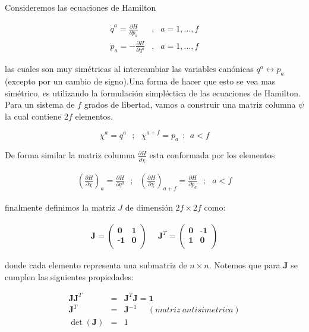 \documentclass[12pt]{report}
\begin{document}
Consideremos las ecuaciones de  Hamilton

\begin{eqnarray}
\dot{q}^a = \frac{\partial H}{\partial p_a}  &,&  a= 1,...,f \\
\dot{p}_a = -\frac{\partial H}{\partial q^a}  &,&  a=1,...,f 
\end{eqnarray} 

las cuales son muy simétricas al intercambiar las variables canónicas $q^a\leftrightarrow p_a$ (excepto por un cambio de signo).Una forma de hacer que esto se vea mas simétrico, es utilizando la formulación simpléctica de las ecuaciones de Hamilton. Para un sistema de $f$ grados de libertad, vamos a construir una matriz columna $\psi$ la cual contiene $2f$ elementos.

\begin{equation}
\chi^a = q^a \ \ \ ; \ \ \ \chi^{a+f}=p_a  \ \ ; \ \ a<f  
\end{equation}


De forma similar la matriz columna $\displaystyle\frac{\partial H}{\partial 
\chi}$ esta conformada por los elementos 

\begin{eqnarray}
\left( \frac{\partial H}{\partial \chi} \right)_a = \frac{\partial H}{\partial q^a} \ \ \ ; \ \ \  \left( \frac{\partial H}{\partial \chi} \right)_{a+f} =  \frac{\partial H}{\partial p_a}  \ \ \ ;  \ \ \ a<f
\end{eqnarray}


finalmente definimos la matriz $J$ de dimensión $2f \times 2f$ como:


\begin{eqnarray} 
\textbf{J}=
\left( 
\begin{array}{cc} 
\textbf{0} & \textbf{1}  \\
\textbf{-1} & \textbf{0}   \\
\end{array}
\right) \ \ \ \ \ \
\textbf{J}^T=\left( 
\begin{array}{cc} 
\textbf{0} & \textbf{-1}  \\
\textbf{1} & \textbf{0}   \\
\end{array}
\right)
\end{eqnarray}

donde cada elemento representa una submatriz de $n \times n$. Notemos que para $\textbf{J}$ se cumplen las siguientes propiedades:


\begin{eqnarray}
\textbf{J}\textbf{J}^T&=&\textbf{J}^T\textbf{J}=\textbf{1} \\
\textbf{J}^T&=&\textbf{J}^{-1} \ \ \  \ \ \ (matriz \ antisimetrica) \\
\det(\textbf{J})&=&1
\end{eqnarray}
\end{document}
